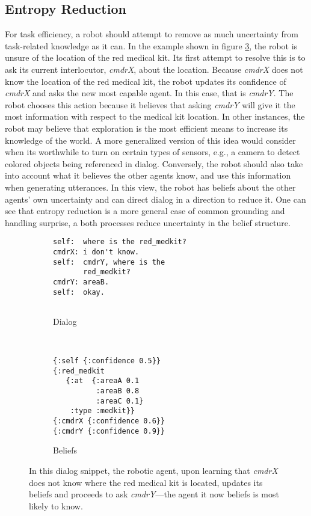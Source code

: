 \documentclass[12pt]{article}
\begin{document}
\subsection{Entropy Reduction}

For task efficiency, a robot should attempt to remove as much
uncertainty from task-related knowledge as it can. In the example
shown in figure \ref{fig:er}, the robot is unsure of the location of
the red medical kit. Its first attempt to resolve this is to ask its
current interlocutor, \textit{cmdrX}, about the location. Because
\textit{cmdrX} does not know the location of the red medical kit, the
robot updates its confidence of \textit{cmdrX} and asks the new most
capable agent. In this case, that is \textit{cmdrY}. The robot chooses
this action because it believes that asking \textit{cmdrY} will give
it the most information with respect to the medical kit location. In
other instances, the robot may believe that exploration is the most
efficient means to increase its knowledge of the world. A more
generalized version of this idea would consider when its worthwhile to
turn on certain types of sensors, e.g., a camera to detect colored
objects being referenced in dialog. Conversely, the robot should also
take into account what it believes the other agents know, and use this
information when generating utterances. In this view, the robot has
beliefs about the other agents' own uncertainty and can direct dialog
in a direction to reduce it. One can see that entropy reduction is a
more general case of common grounding and handling surprise, a both
processes reduce uncertainty in the belief structure.

\begin{figure}[h]
  \centering
  \begin{subfigure}[t]{0.4\textwidth}
    \centering
\begin{verbatim}
self:  where is the red_medkit?
cmdrX: i don't know.
self:  cmdrY, where is the
       red_medkit?
cmdrY: areaB.
self:  okay.


\end{verbatim}
    \label{fig:er_text}
    \caption{Dialog}
  \end{subfigure}
  ~\qquad\qquad
  \begin{subfigure}[t]{0.4\textwidth}
    \centering
\begin{verbatim}
{:self {:confidence 0.5}}
{:red_medkit
   {:at  {:areaA 0.1
          :areaB 0.8
          :areaC 0.1}
    :type :medkit}}
{:cmdrX {:confidence 0.6}}
{:cmdrY {:confidence 0.9}}
\end{verbatim}
    \label{fig:er_beliefs}
    \caption{Beliefs}
  \end{subfigure}
  \caption{In this dialog snippet, the robotic agent, upon learning
    that \textit{cmdrX} does not know where the red medical kit is
    located, updates its beliefs and proceeds to ask \textit{cmdrY}---the agent it now
    beliefs is most likely to know.}
  \label{fig:er}
\end{figure}
\end{document}
